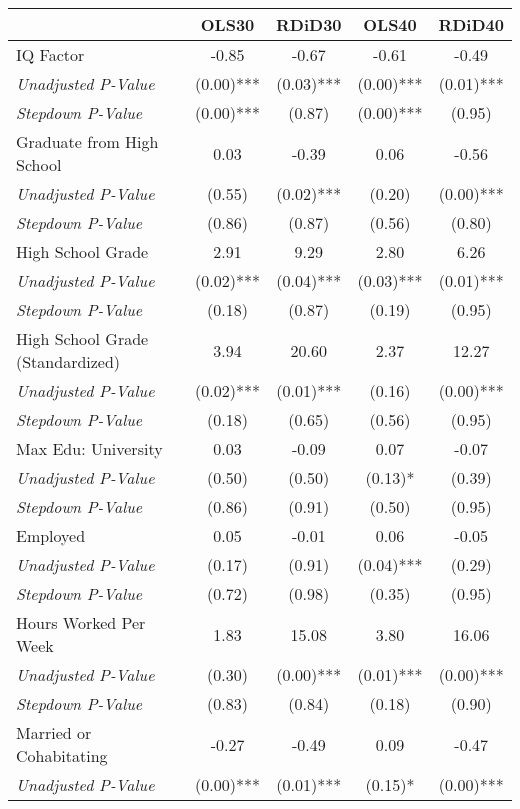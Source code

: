 \begin{tabular}{l c c c c}
\toprule
 & OLS30 & RDiD30 & OLS40 & RDiD40 \\
\midrule
IQ Factor & -0.85 & -0.67 & -0.61 & -0.49 \\
\quad \textit{Unadjusted P-Value} & (0.00)*** & (0.03)*** & (0.00)*** & (0.01)*** \\
\quad \textit{Stepdown P-Value} & (0.00)*** & (0.87) & (0.00)*** & (0.95) \\
Graduate from High School & 0.03 & -0.39 & 0.06 & -0.56 \\
\quad \textit{Unadjusted P-Value} & (0.55) & (0.02)*** & (0.20) & (0.00)*** \\
\quad \textit{Stepdown P-Value} & (0.86) & (0.87) & (0.56) & (0.80) \\
High School Grade & 2.91 & 9.29 & 2.80 & 6.26 \\
\quad \textit{Unadjusted P-Value} & (0.02)*** & (0.04)*** & (0.03)*** & (0.01)*** \\
\quad \textit{Stepdown P-Value} & (0.18) & (0.87) & (0.19) & (0.95) \\
High School Grade (Standardized) & 3.94 & 20.60 & 2.37 & 12.27 \\
\quad \textit{Unadjusted P-Value} & (0.02)*** & (0.01)*** & (0.16) & (0.00)*** \\
\quad \textit{Stepdown P-Value} & (0.18) & (0.65) & (0.56) & (0.95) \\
Max Edu: University & 0.03 & -0.09 & 0.07 & -0.07 \\
\quad \textit{Unadjusted P-Value} & (0.50) & (0.50) & (0.13)* & (0.39) \\
\quad \textit{Stepdown P-Value} & (0.86) & (0.91) & (0.50) & (0.95) \\
Employed & 0.05 & -0.01 & 0.06 & -0.05 \\
\quad \textit{Unadjusted P-Value} & (0.17) & (0.91) & (0.04)*** & (0.29) \\
\quad \textit{Stepdown P-Value} & (0.72) & (0.98) & (0.35) & (0.95) \\
Hours Worked Per Week & 1.83 & 15.08 & 3.80 & 16.06 \\
\quad \textit{Unadjusted P-Value} & (0.30) & (0.00)*** & (0.01)*** & (0.00)*** \\
\quad \textit{Stepdown P-Value} & (0.83) & (0.84) & (0.18) & (0.90) \\
Married or Cohabitating & -0.27 & -0.49 & 0.09 & -0.47 \\
\quad \textit{Unadjusted P-Value} & (0.00)*** & (0.01)*** & (0.15)* & (0.00)*** \\

\end{tabular}
